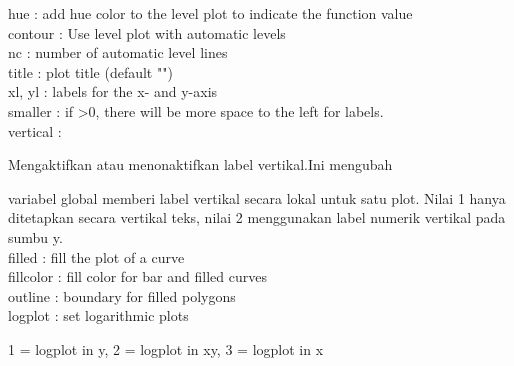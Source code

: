 \documentclass[a4paper,10pt]{article}
\begin{document}
\begin{eulernotebook}
\begin{eulercomment}
\begin{eulercomment}
\begin{eulercomment}
\begin{eulercomment}
\begin{eulercomment}
\begin{eulercomment}
\begin{eulercomment}
\begin{eulercomment}
\begin{eulercomment}
\begin{eulercomment}
\begin{eulercomment}
\begin{eulercomment}
\begin{eulercomment}
\begin{eulercomment}
\begin{eulercomment}
\begin{eulercomment}
\begin{eulercomment}
\begin{eulercomment}
\begin{eulercomment}
\begin{eulercomment}
\begin{eulercomment}
\begin{eulercomment}
\begin{eulercomment}
\begin{eulercomment}
\begin{eulercomment}
\begin{eulercomment}
\begin{eulercomment}
\begin{eulercomment}
\begin{eulercomment}
\begin{eulercomment}
\begin{eulercomment}
\begin{eulercomment}
\begin{eulercomment}
\begin{eulercomment}
\begin{eulercomment}
\begin{eulercomment}
\begin{eulercomment}
\begin{eulercomment}
\begin{eulercomment}
hue       : add hue color to the level plot to indicate the function
value\\
contour   : Use level plot with automatic levels\\
nc        : number of automatic level lines\\
title     : plot title (default "")\\
xl, yl    : labels for the x- and y-axis\\
smaller   : if \textgreater{}0, there will be more space to the left for labels.\\
vertical  :\\
\end{eulercomment}
\begin{eulerttcomment}
  Mengaktifkan atau menonaktifkan label vertikal.Ini   mengubah
\end{eulerttcomment}
\begin{eulercomment}
variabel global memberi label vertikal secara   lokal untuk satu plot.
Nilai 1 hanya ditetapkan secara   vertikal teks, nilai 2 menggunakan
label numerik   vertikal pada sumbu y.\\
filled    : fill the plot of a curve\\
fillcolor : fill color for bar and filled curves\\
outline   : boundary for filled polygons\\
logplot   : set logarithmic plots\\
\end{eulercomment}
\begin{eulerttcomment}
            1 = logplot in y,
            2 = logplot in xy,
            3 = logplot in x
\end{eulerttcomment}

\end{eulercomment}
\end{eulercomment}
\end{eulercomment}
\end{eulercomment}
\end{eulercomment}
\end{eulercomment}
\end{eulercomment}
\end{eulercomment}
\end{eulercomment}
\end{eulercomment}
\end{eulercomment}
\end{eulercomment}
\end{eulercomment}
\end{eulercomment}
\end{eulercomment}
\end{eulercomment}
\end{eulercomment}
\end{eulercomment}
\end{eulercomment}
\end{eulercomment}
\end{eulercomment}
\end{eulercomment}
\end{eulercomment}
\end{eulercomment}
\end{eulercomment}
\end{eulercomment}
\end{eulercomment}
\end{eulercomment}
\end{eulercomment}
\end{eulercomment}
\end{eulercomment}
\end{eulercomment}
\end{eulercomment}
\end{eulercomment}
\end{eulercomment}
\end{eulercomment}
\end{eulercomment}
\end{eulercomment}
\end{eulernotebook}
\end{document}
